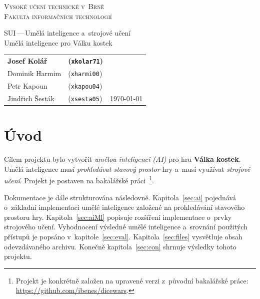 \documentclass[11pt, a4paper]{article}
\theoremstyle{definition}
\begin{document}
\begin{titlepage}
    \begin{center}
        \LARGE{\textsc{Vysoké učení technické v~Brně}} \\
        \smallskip
        \Large{\textsc{Fakulta informačních technologií}} \\


        \LARGE{SUI\,---\,Umělá inteligence a~strojové učení} \\
        \smallskip
        \Huge{Umělá inteligence pro Válku kostek} \\

    \end{center}

    \Large{%
        \begin{tabular}{l l r}
            \textbf{Josef Kolář} & \textbf{(\texttt{xkolar71})} & \\
            Dominik Harmim & (\texttt{xharmi00}) & \\
            Petr Kapoun & (\texttt{xkapou04}) & \\
            Jindřich Šesták & (\texttt{xsesta05}) & \hspace{9em} \today
        \end{tabular}
    }
\end{titlepage}


\setcounter{page}{1}
\tableofcontents
\clearpage


\setcounter{page}{1}

\section{Úvod}

Cílem projektu bylo vytvořit \emph{umělou inteligenci (AI)} pro hru
\textbf{Válka kostek}. Umělá inteligence musí \emph{prohledávat stavový
prostor} hry a~musí využívat \emph{strojové učení}. Projekt je postaven
na bakalářské práci~\cite{turecekBP}\footnote{Projekt je konkrétně
založen na upravené verzi z~původní bakalářské
práce: \url{https://github.com/ibenes/dicewars}.}.

Dokumentace je dále strukturována následovně. Kapitola~\ref{sec:ai}
pojednává o~základní implementaci umělé inteligence založené na prohledávání
stavového prostoru hry. Kapitola~\ref{sec:aiMl} popisuje rozšíření
implementace o~prvky strojového učení. Vyhodnocení výsledné umělé
inteligence a~srovnání použitých přístupů je popsáno v~kapitole~\ref{sec:eval}.
Kapitola~\ref{sec:files} vysvětluje obsah odevzdávaného archivu. Konečně
kapitola~\ref{sec:con} shrnuje výsledky tohoto projektu.
\end{document}
